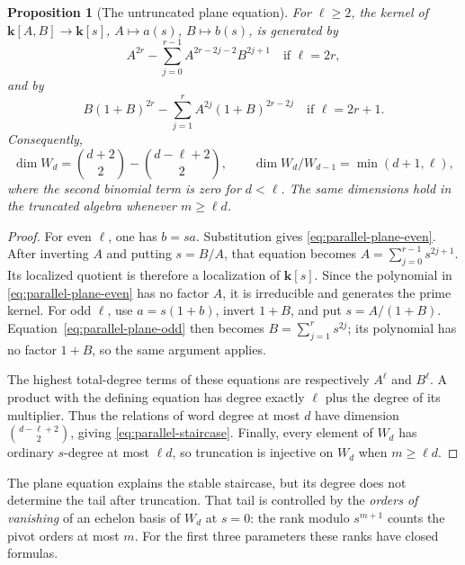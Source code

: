 \documentclass[reqno]{article}
\theoremstyle{plain} %
\newtheorem{proposition}[theorem]{Proposition}
\theoremstyle{definition}
\theoremstyle{remark}
\newcommand{\K} {\mathbf{k}}
\numberwithin{equation}{section}
\begin{document}
\begin{proposition}[The untruncated plane equation]
\label{prop:parallel-plane-equation}
For $\ell\ge2$, the kernel of $\K[A,B]\to\K[s]$, $A\mapsto a(s)$,
$B\mapsto b(s)$, is generated by
\begin{equation}\label{eq:parallel-plane-even}
 A^{2r}-\sum_{j=0}^{r-1}A^{2r-2j-2}B^{2j+1}
 \quad\text{if }\ell=2r,
\end{equation}
and by
\begin{equation}\label{eq:parallel-plane-odd}
 B(1+B)^{2r}-\sum_{j=1}^{r}A^{2j}(1+B)^{2r-2j}
 \quad\text{if }\ell=2r+1.
\end{equation}
Consequently,
\begin{equation}\label{eq:parallel-staircase}
 \dim W_d=\binom{d+2}{2}-\binom{d-\ell+2}{2},\qquad
 \dim W_d/W_{d-1}=\min(d+1,\ell),
\end{equation}
where the second binomial term is zero for $d<\ell$.
The same dimensions hold in the truncated algebra whenever $m\ge\ell d$.
\end{proposition}
\begin{proof}
For even $\ell$, one has $b=sa$. Substitution gives
\eqref{eq:parallel-plane-even}. After inverting $A$ and putting $s=B/A$,
that equation becomes
$A=\sum_{j=0}^{r-1}s^{2j+1}$. Its localized quotient is therefore a
localization of $\K[s]$. Since the polynomial in
\eqref{eq:parallel-plane-even} has no factor $A$, it is irreducible and
generates the prime kernel. For odd $\ell$, use $a=s(1+b)$, invert
$1+B$, and put $s=A/(1+B)$. Equation~\eqref{eq:parallel-plane-odd}
then becomes $B=\sum_{j=1}^{r}s^{2j}$; its polynomial has no factor
$1+B$, so the same argument applies.

The highest total-degree terms of these equations are respectively
$A^\ell$ and $B^\ell$. A product with the defining equation has degree
exactly $\ell$ plus the degree of its multiplier. Thus the relations of
word degree at most $d$ have dimension $\binom{d-\ell+2}{2}$, giving
\eqref{eq:parallel-staircase}. Finally, every element of $W_d$ has
ordinary $s$-degree at most $\ell d$, so truncation is injective on
$W_d$ when $m\ge\ell d$.
\end{proof}

The plane equation explains the stable staircase, but its degree does
not determine the tail after truncation. That tail is controlled by
the \emph{orders of vanishing} of an echelon basis of $W_d$ at $s=0$:
the rank modulo $s^{m+1}$ counts the pivot orders at most $m$.
For the first three parameters these ranks have closed formulas.
\end{document}
